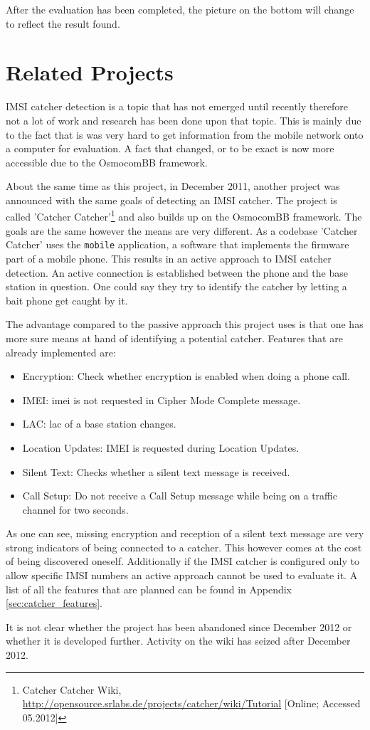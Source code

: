 After the evaluation has been completed, the picture on the bottom will change to reflect the result found.

\section{Related Projects}
IMSI catcher detection is a topic that has not emerged until recently therefore not a lot of work and research has been done upon that topic.
This is mainly due to the fact that is was very hard to get information from the mobile network onto a computer for evaluation.
A fact that changed, or to be exact is now more accessible due to the OsmocomBB framework.

About the same time as this project, in December 2011, another project was announced with the same goals of detecting an IMSI catcher.
The project is called 'Catcher Catcher'\footnote{Catcher Catcher Wiki, \url{http://opensource.srlabs.de/projects/catcher/wiki/Tutorial} [Online; Accessed 05.2012]} and also builds up on the OsmocomBB framework.
The goals are the same however the means are very different.
As a codebase 'Catcher Catcher' uses the \texttt{mobile} application, a software that implements the firmware part of a mobile phone.
This results in an active approach to IMSI catcher detection.
An active connection is established between the phone and the base station in question.
One could say they try to identify the catcher by letting a bait phone get caught by it.

The advantage compared to the passive approach this project uses is that one has more sure means at hand of identifying a potential catcher.
Features that are already implemented are\cite{catcher_catcher}:
\begin{itemize}
	\item Encryption: Check whether encryption is enabled when doing a phone call.
	\item IMEI: \gls{imei} is not requested in Cipher Mode Complete message.
	\item LAC: \gls{lac} of a base station changes.
	\item Location Updates: IMEI is requested during Location Updates.
	\item Silent Text: Checks whether a silent text message is received.
	\item Call Setup: Do not receive a Call Setup message while being on a traffic channel for two seconds.
\end{itemize}
As one can see, missing encryption and reception of a silent text message are very strong indicators of being connected to a catcher.
This however comes at the cost of being discovered oneself.
Additionally if the IMSI catcher is configured only to allow specific IMSI numbers an active approach cannot be used to evaluate it.
A list of all the features that are planned can be found in Appendix \ref{sec:catcher_features}.

It is not clear whether the project has been abandoned since December 2012 or whether it is developed further. 
Activity on the wiki has seized after December 2012.
